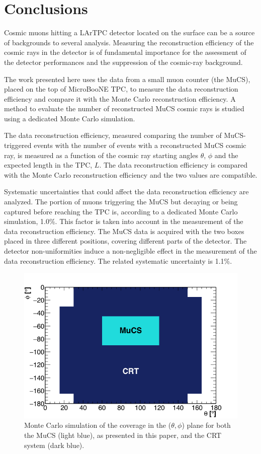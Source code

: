 \documentclass[a4paper,11pt]{article}
\begin{document}
\section{Conclusions}
Cosmic muons hitting a LArTPC detector located on the surface can be a source of backgrounds to several analysis. Measuring the reconstruction efficiency of the cosmic rays in the detector is of fundamental importance for the assessment of the detector performances and the suppression of the cosmic-ray background.

The work presented here uses the data from a small muon counter (the MuCS), placed on the top of MicroBooNE TPC, to measure the data reconstruction efficiency and compare it with the Monte Carlo reconstruction efficiency.
A method to evaluate the number of reconstructed MuCS cosmic rays is studied using a dedicated Monte Carlo simulation.

The data reconstruction efficiency, measured comparing the number of MuCS-triggered events with the number of events with a reconstructed MuCS cosmic ray, is measured as a function of the cosmic ray starting angles $\theta$, $\phi$ and the expected length in the TPC, $L$. The data reconstruction efficiency is compared with the Monte Carlo reconstruction efficiency and the two values are compatible.

Systematic uncertainties that could affect the data reconstruction efficiency are analyzed. The portion of muons triggering the MuCS but decaying or being captured before reaching the TPC is, according to a dedicated Monte Carlo simulation, 1.0\%. This factor is taken into account in the measurement of the data reconstruction efficiency.
The MuCS data is acquired with the two boxes placed in three different positions, covering different parts of the detector. The detector non-uniformities induce a non-negligible effect in the measurement of the data reconstruction efficiency. The related systematic uncertainty is 1.1\%.

\begin{figure}[htbp]
  \begin{center}
    \includegraphics[width=0.7\linewidth]{figures/crt.png}
    \caption{Monte Carlo simulation of the coverage in the ($\theta,\phi$) plane for both the MuCS (light blue), as presented in this paper, and the CRT system (dark blue).} \label{fig:crt}
  \end{center}
\end{figure}
\end{document}
